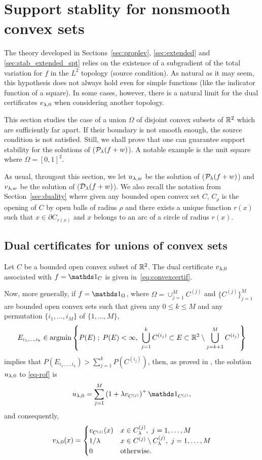 
\section{Support stablity for nonsmooth convex sets}\label{sec:no_source_cond}

The theory developed in Sections~\ref{sec:proplev}, \ref{sec:extended} and \ref{sec:stab_extended_spt} relies on the existence of a subgradient of the total variation for $f$ in the $L^2$ topology (source condition). As natural as it may seem, this hypothesis does not always hold even for simple functions (like the indicator function of a square). In some cases, however, there is a natural limit for the dual certificates $v_{\lambda,0}$ when considering another topology.

 This section studies the case of a union $\Omega$ of disjoint convex subsets of $\mathbb{R}^2$ which are sufficiently far apart. If their boundary is not smooth enough, the source condition is not satisfied. Still, we shall prove that one can  guarantee support stability for the solutions of ($\mathcal{P}_\lambda(f+w)$). A notable example is the unit square where $\Omega=[0,1]^2$.

 
 As usual, througout this section, we let $u_{\lambda,w}$ be the solution of ($\mathcal{P}_\lambda(f+w)$) and $v_{\lambda,w}$ be the solution of ($\mathcal{D}_\lambda(f+w)$). We also recall the notation from Section~\ref{sec:duality} where
given any bounded open convex set $C$,   $C_\rho$ is the opening of $C$ by open balls of radius $\rho$ and there exists a unique function $r(x)$ such that $x\in\partial C_{r(x)}$ and $x$ belongs to an arc of a circle of radius $r(x)$. 


\subsection{Dual certificates for unions of convex sets}\label{sec:dual_cert_cvx_sets}
Let $C$ be a bounded open convex subset of $\mathbb{R}^2$. The dual certificate $v_{\lambda,0}$ associated with $f=\bun{C}$ is given in~\eqref{eq:convexcertif}.

Now, more generally, if $f = \bun{\Omega}$, where  $\Omega = \cup_{j=1}^M C^{(j)}$ and $\{C^{(j)}\}_{j=1}^M$  are bounded open convex sets such that given any $0\leq k\leq M$ and any permutation $\{i_1,\ldots, i_M\}$ of $\{1,\ldots, M\}$,
$$
E_{i_1,\ldots, i_k}\in \operatorname{argmin}\left\{ P(E) \;;\;  P(E)<\infty, ~ \bigcup_{j=1}^k C^{(i_j)}\subset E\subset \mathbb{R}^2\setminus \bigcup_{j=k+1}^M C^{(i_j)} \right\}
$$
implies that  $P(E_{i_1,\ldots, i_k}) > \sum_{j=1}^k P(C^{(i_j)})$, then, as proved in \cite{altercalib05,alterconvex05}, the solution $u_{\lambda,0}$ to \eqref{eq-rof} is
$$
u_{\la,0} = \sum_{j=1}^M \left(1+\la v_{C^{(j)}} \right)^+ \bun{C^{(j)}},
$$
and consequently,
$$
v_{\lambda,0}(x) = \begin{cases}
v_{C^{(j)}}(x) & x\in C_\lambda^{(j)}, ~j=1,\ldots, M \\
1/\lambda & x\in C^{(j)}\setminus C_\lambda^{(j)}, ~j=1,\ldots, M\\
0& \text{otherwise.}
\end{cases}
$$

